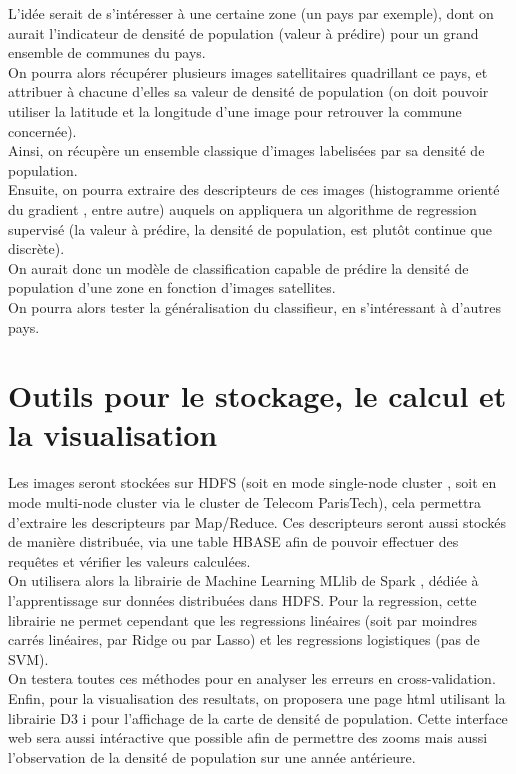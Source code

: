 \documentclass{book}
\begin{document}
L'idée serait de s'intéresser à une certaine zone (un pays par exemple), dont on aurait l'indicateur de densité de population (valeur 
à prédire) pour un grand ensemble de communes du pays.\\
On pourra alors récupérer plusieurs images satellitaires quadrillant ce pays, et attribuer à chacune d'elles
sa valeur de densité de population (on doit pouvoir utiliser la latitude et la longitude d'une image pour retrouver la commune concernée).\\
Ainsi, on récupère un ensemble classique d'images labelisées par sa densité de population.\\
Ensuite, on pourra extraire des descripteurs de ces images (histogramme orienté du gradient \cite{Dalal05histogramsof}, entre autre)
auquels on appliquera un algorithme de regression supervisé (la valeur à prédire, la densité de
population, est plut\^{o}t continue que discrète).\\
On aurait donc un modèle de classification capable de prédire la densité de population d'une zone en fonction d'images satellites.\\
On pourra alors tester la généralisation du classifieur, en s'intéressant à d'autres pays.\\

\chapter{Outils pour le stockage, le calcul et la visualisation}

Les images seront stockées sur HDFS \cite{White:2009:HDG:1717298} (soit en mode \og single-node cluster \fg, soit en mode \og multi-node cluster \fg via le cluster de Telecom ParisTech), cela permettra
d'extraire les descripteurs par Map/Reduce. Ces descripteurs seront aussi stockés de manière distribuée, via une table HBASE afin de 
pouvoir effectuer des requ\^{e}tes et vérifier les valeurs calculées.\\
On utilisera alors la librairie de Machine Learning MLlib de Spark \cite{Meng:2016:MML:2946645.2946679}, dédiée à l'apprentissage sur données distribuées dans HDFS.
Pour la regression, cette librairie ne permet cependant que les regressions linéaires (soit par moindres carrés linéaires, par Ridge ou par Lasso) et les regressions logistiques (pas de SVM).\\
On testera toutes ces méthodes pour en analyser les erreurs en cross-validation.\\
Enfin, pour la visualisation des resultats, on proposera une page html utilisant la librairie D3 i\cite{Jain:2014:DVD:2667432.2667451} pour l'affichage de la carte de densité de population. Cette interface web sera aussi
intéractive que possible afin de permettre des zooms mais aussi l'observation de la densité de population sur une année antérieure.

\clearpage

\backmatter





\end{document}
